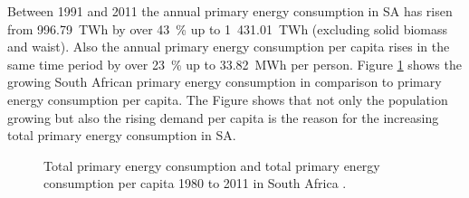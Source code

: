 %


Between 1991 and 2011 the annual primary energy consumption in SA has risen from 996.79~TWh by over 43~\% up to 1~431.01~TWh (excluding solid biomass and waist). Also the annual primary energy consumption per capita rises in the same time period by over 23~\% up to 33.82~MWh per person. Figure \ref{PEV} shows the growing South African primary energy consumption in comparison to primary energy consumption per capita. The Figure shows that not only the population growing but also the rising demand per capita is the reason for the increasing total primary energy consumption in SA.  \cite{BP2014b}
\begin{figure}[htb] %
  \centering
  \caption[Total primary energy consumption and total primary energy consumption per capita 1980 to 2011 in South Africa. ]{Total primary energy consumption and total primary energy consumption per capita 1980 to 2011 in South Africa \cite{BP2014b,EIA2015}.}\label{PEV}
\end{figure}

